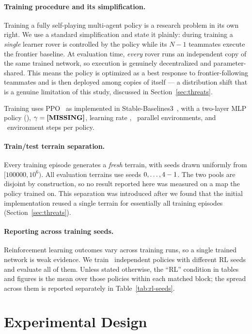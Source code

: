 \documentclass[11pt]{article}
\begin{document}
\paragraph{Training procedure and its simplification.}
Training a fully self-playing multi-agent policy is a research problem in its
own right. We use a standard simplification and state it plainly: during
training a \emph{single} learner rover is controlled by the policy while its
$N-1$ teammates execute the frontier baseline. At evaluation time, \emph{every}
rover runs an independent copy of the same trained network, so execution is
genuinely decentralized and parameter-shared. This means the policy is
optimized as a best response to frontier-following teammates and is then
deployed among copies of itself --- a distribution shift that is a genuine
limitation of this study, discussed in Section~\ref{sec:threats}.

Training uses PPO~\cite{schulman2017} as implemented in
Stable-Baselines3~\cite{raffin2021}, with a two-layer MLP policy
(\RLArch), $\gamma = \textbf{[MISSING]}$, learning rate \RLLR, \RLEnvs\ parallel
environments, and \RLTimesteps\ environment steps per policy.

\paragraph{Train/test terrain separation.}
Every training episode generates a \emph{fresh} terrain, with seeds drawn
uniformly from $[100000, 10^6)$. All evaluation terrains use seeds
$0,\dots,4-1$. The two pools are disjoint by construction, so no result
reported here was measured on a map the policy trained on. This separation was
introduced after we found that the initial implementation reused a single
terrain for essentially all training episodes (Section~\ref{sec:threats}).

\paragraph{Reporting across training seeds.}
Reinforcement learning outcomes vary across training runs, so a single trained
network is weak evidence. We train \NRLSeeds\ independent policies with
different RL seeds and evaluate all of them. Unless stated otherwise, the
``RL'' condition in tables and figures is the mean over those policies within
each matched block; the spread across them is reported separately in
Table~\ref{tab:rl-seeds}.

\section{Experimental Design}
\label{sec:design}
\end{document}

